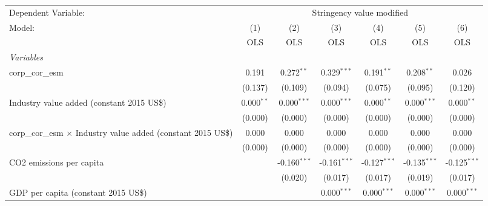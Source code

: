 
\begingroup
\centering
\begin{tabular}{lcccccc}
   \toprule
   Dependent Variable: & \multicolumn{6}{c}{Stringency value modified}\\
   Model:                                                                & (1)          & (2)            & (3)            & (4)            & (5)            & (6)\\  
                                                                         &  OLS         & OLS            & OLS            & OLS            & OLS            & OLS\\  
   \midrule
   \emph{Variables}\\
   corp\_cor\_esm                                                        & 0.191        & 0.272$^{**}$   & 0.329$^{***}$  & 0.191$^{**}$   & 0.208$^{**}$   & 0.026\\   
                                                                         & (0.137)      & (0.109)        & (0.094)        & (0.075)        & (0.095)        & (0.120)\\   
   Industry value added (constant 2015 US\$)                             & 0.000$^{**}$ & 0.000$^{***}$  & 0.000$^{***}$  & 0.000$^{**}$   & 0.000$^{***}$  & 0.000$^{**}$\\   
                                                                         & (0.000)      & (0.000)        & (0.000)        & (0.000)        & (0.000)        & (0.000)\\   
   corp\_cor\_esm $\times$ Industry value added (constant 2015 US\$)     & 0.000        & 0.000          & 0.000          & 0.000          & 0.000          & 0.000\\   
                                                                         & (0.000)      & (0.000)        & (0.000)        & (0.000)        & (0.000)        & (0.000)\\   
   CO2 emissions per capita                                              &              & -0.160$^{***}$ & -0.161$^{***}$ & -0.127$^{***}$ & -0.135$^{***}$ & -0.125$^{***}$\\   
                                                                         &              & (0.020)        & (0.017)        & (0.017)        & (0.019)        & (0.017)\\   
   GDP per capita (constant 2015 US\$)                                   &              &                & 0.000$^{***}$  & 0.000$^{***}$  & 0.000$^{***}$  & 0.000$^{***}$\\   

\end{tabular}
